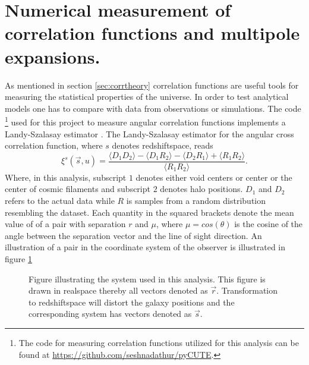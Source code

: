 \section{Numerical measurement of correlation functions and multipole expansions.}\label{sec:numerical_corr}
As mentioned in section \ref{sec:corrtheory} correlation functions are useful
tools for measuring the statistical properties of the universe. In order to test
analytical models one has to compare with data from observations or simulations.
The code \footnote{The code for measuring correlation functions utilized for this analysis can be found at \url{https://github.com/seshnadathur/pyCUTE}.} used for this project to measure angular correlation functions
implements a Landy-Szalasay estimator \cite{Landy}. The Landy-Szalasay estimator
for the angular cross correlation function, where $s$ denotes redshiftspace, reads
\begin{equation}
    \xi^s(\vec{s},u)=\frac{\langle D_1D_2\rangle-\langle D_1R_2\rangle-\langle D_2R_1\rangle+\langle R_1R_2\rangle}{\langle R_1R_2\rangle}.
\end{equation}
Where, in this analysis, subscript $1$ denotes either void centers or center or
the center of cosmic filaments and subscript $2$ denotes halo positions. $D_1$
and $D_2$ refers to the actual data while $R$ is samples from a random
distribution resembling the dataset. Each quantity in the squared brackets
denote the mean value of of a pair with separation $r$ and $\mu$, where
$\mu=cos(\theta)$ is the cosine of the angle between the separation vector and
the line of sight direction. An illustration of a pair in the coordinate system
of the observer is illustrated in figure \ref{fig:corrpair}
\begin{figure}\label{fig:corrpair}
    \caption{Figure illustrating the system used in this analysis. This
    figure is drawn in realspace thereby all vectors denoted as $\vec{r}$.
    Transformation to redshiftspace will distort the galaxy positions and the
    corresponding system has vectors denoted as $\vec{s}$.}
\end{figure}

